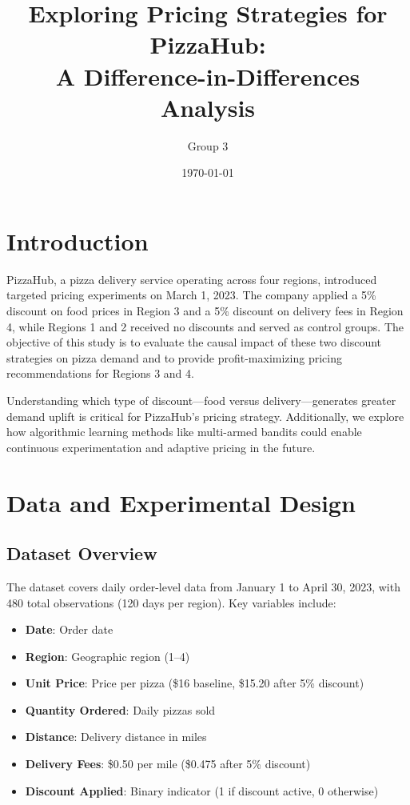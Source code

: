 \documentclass[12pt]{article}
\title{\textbf{Exploring Pricing Strategies for PizzaHub: \\A Difference-in-Differences Analysis}}
\author{Group 3}
\date{\today}
\begin{document}
\maketitle

\section{Introduction}

PizzaHub, a pizza delivery service operating across four regions, introduced targeted pricing experiments on March 1, 2023. The company applied a 5\% discount on food prices in Region 3 and a 5\% discount on delivery fees in Region 4, while Regions 1 and 2 received no discounts and served as control groups. The objective of this study is to evaluate the causal impact of these two discount strategies on pizza demand and to provide profit-maximizing pricing recommendations for Regions 3 and 4.

Understanding which type of discount—food versus delivery—generates greater demand uplift is critical for PizzaHub's pricing strategy. Additionally, we explore how algorithmic learning methods like multi-armed bandits could enable continuous experimentation and adaptive pricing in the future.

\section{Data and Experimental Design}

\subsection{Dataset Overview}

The dataset covers daily order-level data from January 1 to April 30, 2023, with 480 total observations (120 days per region). Key variables include:

\begin{itemize}[nosep]
    \item \textbf{Date}: Order date
    \item \textbf{Region}: Geographic region (1--4)
    \item \textbf{Unit Price}: Price per pizza (\$16 baseline, \$15.20 after 5\% discount)
    \item \textbf{Quantity Ordered}: Daily pizzas sold
    \item \textbf{Distance}: Delivery distance in miles
    \item \textbf{Delivery Fees}: \$0.50 per mile (\$0.475 after 5\% discount)
    \item \textbf{Discount Applied}: Binary indicator (1 if discount active, 0 otherwise)
\end{itemize}
\end{document}
